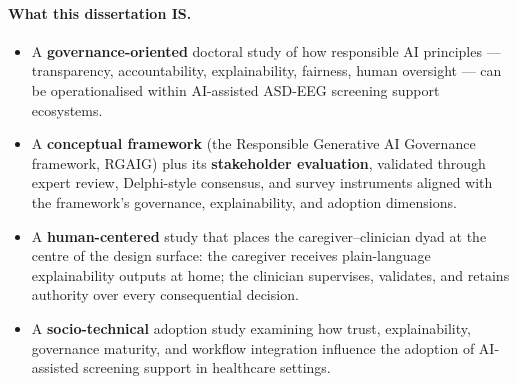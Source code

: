 \paragraph{What this dissertation IS.}
\begin{itemize}[leftmargin=*, itemsep=3pt]
    \item A \textbf{governance-oriented} doctoral study of how responsible AI principles --- transparency, accountability, explainability, fairness, human oversight --- can be operationalised within AI-assisted ASD-EEG screening support ecosystems.
    \item A \textbf{conceptual framework} (the Responsible Generative AI Governance framework, RGAIG) plus its \textbf{stakeholder evaluation}, validated through expert review, Delphi-style consensus, and survey instruments aligned with the framework's governance, explainability, and adoption dimensions.
    \item A \textbf{human-centered} study that places the caregiver--clinician dyad at the centre of the design surface: the caregiver receives plain-language explainability outputs at home; the clinician supervises, validates, and retains authority over every consequential decision.
    \item A \textbf{socio-technical} adoption study examining how trust, explainability, governance maturity, and workflow integration influence the adoption of AI-assisted screening support in healthcare settings.
\end{itemize}

